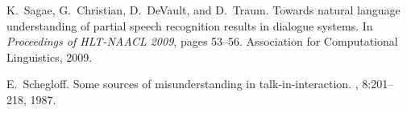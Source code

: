\documentclass[11pt]{article}
\begin{document}
\begin{thebibliography}{}
K.~Sagae, G.~Christian, D.~DeVault, and D.~Traum.
\newblock Towards natural language understanding of partial speech recognition
  results in dialogue systems.
\newblock In {\em Proceedings of HLT-NAACL 2009}, pages 53--56. Association for
  Computational Linguistics, 2009.

E.~Schegloff.
\newblock Some sources of misunderstanding in talk-in-interaction.
, 8:201--218, 1987.

\end{thebibliography}
\end{document}
